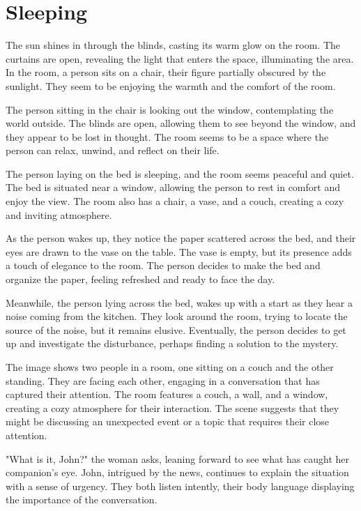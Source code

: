 \documentclass[smalldemyvopaper,11pt,twoside,onecolumn,openright,extrafontsizes]{memoir}
\begin{document}
\chapter{Sleeping}
The sun shines in through the blinds, casting its warm glow on the room. The curtains are open, revealing the light that enters the space, illuminating the area. In the room, a person sits on a chair, their figure partially obscured by the sunlight. They seem to be enjoying the warmth and the comfort of the room.\par
The person sitting in the chair is looking out the window, contemplating the world outside. The blinds are open, allowing them to see beyond the window, and they appear to be lost in thought. The room seems to be a space where the person can relax, unwind, and reflect on their life.\par
The person laying on the bed is sleeping, and the room seems peaceful and quiet. The bed is situated near a window, allowing the person to rest in comfort and enjoy the view. The room also has a chair, a vase, and a couch, creating a cozy and inviting atmosphere.\par
As the person wakes up, they notice the paper scattered across the bed, and their eyes are drawn to the vase on the table. The vase is empty, but its presence adds a touch of elegance to the room. The person decides to make the bed and organize the paper, feeling refreshed and ready to face the day.\par
Meanwhile, the person lying across the bed, wakes up with a start as they hear a noise coming from the kitchen. They look around the room, trying to locate the source of the noise, but it remains elusive. Eventually, the person decides to get up and investigate the disturbance, perhaps finding a solution to the mystery.\par
The image shows two people in a room, one sitting on a couch and the other standing. They are facing each other, engaging in a conversation that has captured their attention. The room features a couch, a wall, and a window, creating a cozy atmosphere for their interaction. The scene suggests that they might be discussing an unexpected event or a topic that requires their close attention.\par
"What is it, John?" the woman asks, leaning forward to see what has caught her companion's eye. John, intrigued by the news, continues to explain the situation with a sense of urgency. They both listen intently, their body language displaying the importance of the conversation.\par
\end{document}
